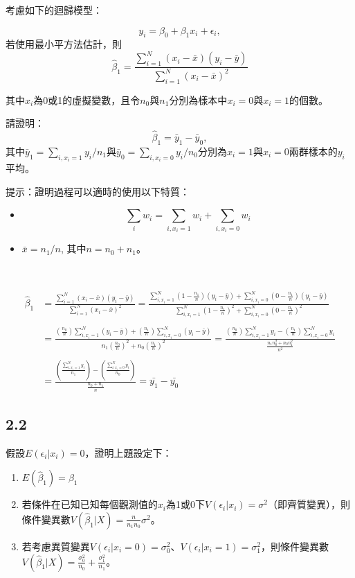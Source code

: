 \documentclass[]{article}
\begin{document}
考慮如下的迴歸模型：

\[y_i=\beta_0+\beta_1x_i+\epsilon_i,\] 若使用最小平方法估計，則
\[\hat{\beta}_1=\frac{\sum_{i=1}^N (x_i-\bar{x})(y_i-\bar{y})}{\sum_{i=1}^N (x_i-\bar{x})^2}\]

其中\(x_i\)為0或1的虛擬變數，且令\(n_0\)與\(n_1\)分別為樣本中\(x_i=0\)與\(x_i=1\)的個數。

請證明： \[\hat{\beta}_1=\bar{y}_1-\bar{y}_0,\]
其中\(\bar{y}_1=\sum_{i,x_i=1}y_i/n_1\)與\(\bar{y}_0=\sum_{i,x_i=0}y_i/n_0\)分別為\(x_i=1\)與\(x_i=0\)兩群樣本的\(y_i\)平均。

提示：證明過程可以適時的使用以下特質：

\begin{itemize}
\item
  \[\sum_i w_i=\sum_{i,x_i=1} w_i +\sum_{i,x_i=0} w_i\]
\item
  \(\bar{x}=n_1/n\), 其中\(n=n_0+n_1\)。
\end{itemize}

~

\begin{align}
\hat{\beta}_1
&=\frac{\sum_{i=1}^N (x_i-\bar{x})(y_i-\bar{y})}{\sum_{i=1}^N (x_i-\bar{x})^2}=\frac{\sum_{i,x_i=1}^N (1-\frac{n_1}{n})(y_i-\bar{y})+\sum_{i,x_i=0}^N (0-\frac{n_1}{n})(y_i-\bar{y})}{\sum_{i,x_i=1}^N (1-\frac{n_1}{n})^2+\sum_{i,x_i=0}^N (0-\frac{n_1}{n})^2}\\
\\
&=\frac{(\frac{n_0}{n})\sum_{i,x_i=1}^N(y_i-\bar{y})+(\frac{n_1}{n})\sum_{i,x_i=0}^N(y_i-\bar{y})}{n_1(\frac{n_0}{n})^2+n_0(\frac{n_1}{n})^2}=\frac{(\frac{n_0}{n})\sum_{i,x_i=1}^N y_i-(\frac{n_1}{n})\sum_{i,x_i=0}^N y_i}{\frac{n_1 n_0^2+n_0 n_1^2}{n^2}}\\
\\
&=\frac{(\frac{\sum_{i,x_i=1}^N y_i}{n_1})-(\frac{\sum_{i,x_i=0}^N y_i}{n_0})}{\frac{n_0+ n_1}{n}}=\bar{y_1}-\bar{y_0}
\end{align}

\subsection{2.2}\label{section-1}

假設\(E(\epsilon_i|x_i)=0\)，證明上題設定下：

\begin{enumerate}
\def\labelenumi{(\alph{enumi})}
\item
  \(E(\hat{\beta}_1)=\beta_1\)
\item
  若條件在已知已知每個觀測值的\(x_i\)為1或0下\(V(\epsilon_i|x_i)=\sigma^2\)（即齊質變異），則條件變異數\(V(\hat{\beta}_1|X)=\frac{n}{n_1 n_0}\sigma^2\)。
\item
  若考慮異質變異\(V(\epsilon_i|x_i=0)=\sigma_0^2\)、\(V(\epsilon_i|x_i=1)=\sigma_1^2\)，則條件變異數\(V(\hat{\beta}_1|X)=\frac{\sigma_0^2}{n_0}+\frac{\sigma_1^2}{n_1}\)。
\end{enumerate}
\end{document}
